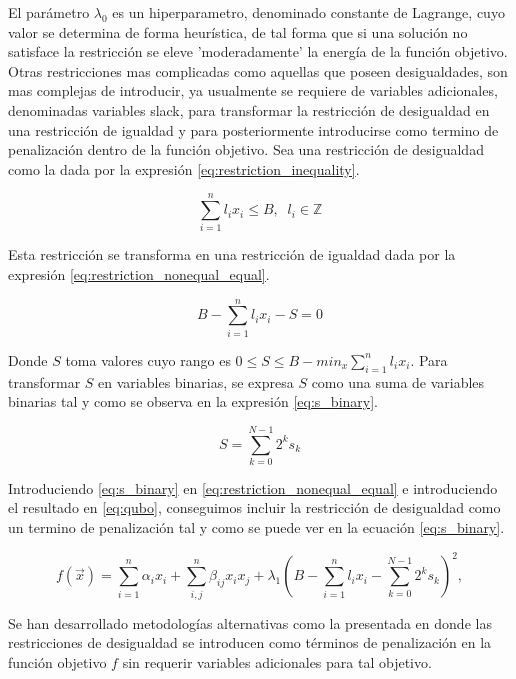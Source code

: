 El parámetro $ \lambda_0$ es un hiperparametro, denominado constante de Lagrange, cuyo valor se determina de forma heurística, de tal forma que si una solución no satisface la restricción se eleve 'moderadamente' la energía de la función objetivo. Otras restricciones mas complicadas como aquellas que poseen desigualdades, son mas complejas de introducir, ya usualmente se requiere de variables adicionales, denominadas variables slack, para transformar la restricción de desigualdad en una restricción de igualdad  y para posteriormente introducirse como termino de penalización dentro de la función objetivo. Sea una restricción de desigualdad como la dada por la expresión \ref{eq:restriction_inequality}.


\begin{equation}
    \sum_{i=1}^nl_ix_i \leq B, \; \; l_i \in \mathbb{Z}
    \label{eq:restriction_inequality}
\end{equation}

Esta restricción se transforma en una restricción de igualdad dada por la expresión \ref{eq:restriction_nonequal_equal}.

\begin{equation}
    B - \sum_{i=1}^n l_ix_i - S = 0
    \label{eq:restriction_nonequal_equal}
\end{equation}

\newpage

Donde $S$ toma valores cuyo rango es $0 \leq S \leq B - min_x \sum_{i=1}^n l_ix_i$. Para transformar $S$ en variables binarias, se expresa $S$ como una suma de variables binarias tal y como se observa en la expresión \ref{eq:s_binary}.

\begin{equation}
    S = \sum_{k=0}^{N-1}2^ks_k
    \label{eq:s_binary}
\end{equation}

Introduciendo \ref{eq:s_binary} en  \ref{eq:restriction_nonequal_equal} e introduciendo el resultado en \ref{eq:qubo}, conseguimos incluir la restricción de desigualdad como un termino de penalización tal y como se puede ver en la ecuación  \ref{eq:s_binary}.

\begin{equation}
    f(\Vec{x}) = \sum_{i=1}^{n} \alpha_{i} x_{i} + \sum_{i,j}^{n} \beta_{ij} x_{i} x_{j} + \lambda_1 (B - \sum_{i=1}^n l_ix_i - \sum_{k=0}^{N-1}2^ks_k)^2,
    \label{eq:s_binary}
\end{equation}

Se han desarrollado metodologías alternativas como la presentada en \citep{montañez} donde las restricciones de desigualdad se introducen como términos de penalización en la función objetivo $f$ sin requerir variables adicionales para tal objetivo. \\

